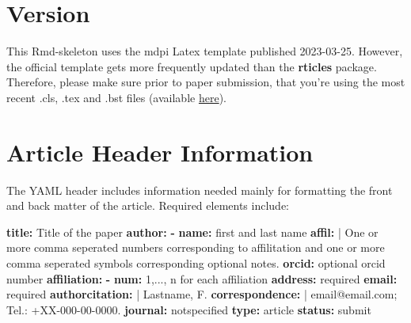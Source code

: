 \documentclass[notspecified,article,submit,moreauthors,pdftex]{Definitions/mdpi}
\newenvironment{Shaded}{\begin{snugshade}}{\end{snugshade}}
\newcommand{\AttributeTok}[1]{\textcolor[rgb]{0.13,0.29,0.53}{#1}}
\newcommand{\CharTok}[1]{\textcolor[rgb]{0.31,0.60,0.02}{#1}}
\newcommand{\FunctionTok}[1]{\textcolor[rgb]{0.13,0.29,0.53}{\textbf{#1}}}
\newcommand{\KeywordTok}[1]{\textcolor[rgb]{0.13,0.29,0.53}{\textbf{#1}}}
\newcommand{\NormalTok}[1]{#1}
\begin{document}

\section{Version}\label{version}

This Rmd-skeleton uses the mdpi Latex template published 2023-03-25.
However, the official template gets more frequently updated than the
\textbf{rticles} package. Therefore, please make sure prior to paper
submission, that you're using the most recent .cls, .tex and .bst files
(available \href{http://www.mdpi.com/authors/latex}{here}).

\section{Article Header Information}\label{article-header-information}

The YAML header includes information needed mainly for formatting the
front and back matter of the article. Required elements include:

\begin{Shaded}
\begin{Highlighting}[]
\FunctionTok{title}\KeywordTok{:}\AttributeTok{ Title of the paper}
\FunctionTok{author}\KeywordTok{:}
\AttributeTok{  }\KeywordTok{{-}}\AttributeTok{ }\FunctionTok{name}\KeywordTok{:}\AttributeTok{ first and last name}
\FunctionTok{    affil}\KeywordTok{: }\CharTok{|}
\NormalTok{      One or more comma seperated numbers corresponding to affilitation}
\NormalTok{      and one or more  comma seperated symbols corresponding }
\NormalTok{      optional notes.}
\AttributeTok{    }\FunctionTok{orcid}\KeywordTok{:}\AttributeTok{ optional orcid number}
\FunctionTok{affiliation}\KeywordTok{:}\AttributeTok{  }
\AttributeTok{  }\KeywordTok{{-}}\AttributeTok{ }\FunctionTok{num}\KeywordTok{:}\AttributeTok{ 1,..., n for each affiliation}
\AttributeTok{    }\FunctionTok{address}\KeywordTok{:}\AttributeTok{ required}
\AttributeTok{    }\FunctionTok{email}\KeywordTok{:}\AttributeTok{ required}
\FunctionTok{authorcitation}\KeywordTok{: }\CharTok{|}
\NormalTok{  Lastname, F.}
\FunctionTok{correspondence}\KeywordTok{: }\CharTok{|}
\NormalTok{  email@email.com; Tel.: +XX{-}000{-}00{-}0000.}
\FunctionTok{journal}\KeywordTok{:}\AttributeTok{ notspecified}
\FunctionTok{type}\KeywordTok{:}\AttributeTok{ article}
\FunctionTok{status}\KeywordTok{:}\AttributeTok{ submit}
\end{Highlighting}
\end{Shaded}
\end{document}
